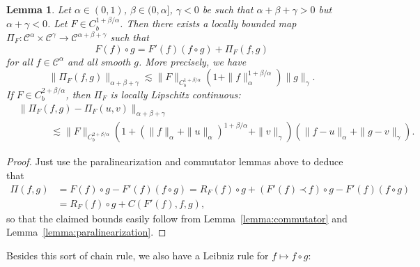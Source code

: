\documentclass[a4paper,11pt]{article}
\newtheorem{lemma}[theorem]{Lemma}
\theoremstyle{remark}
\newcommand{\CC}{\ensuremath{\mathscr{C}}}
\newcommand{\lpara}{\,\mathord{\prec}\,}
\newcommand{\reso}{\,\mathord{\circ}\,}
\begin{document}
\begin{lemma}\label{lemma:para-taylor}
  Let $\alpha \in ( 0,1 )$, $\beta \in (0,\alpha]$, $\gamma < 0$ be such that $\alpha+\beta+\gamma>0$ but $\alpha+\gamma<0$. Let $F \in C^{1+\beta/\alpha}_b$.
  Then there exists a locally bounded map $\Pi_{F} \colon \CC^{\alpha} \times \CC^{\gamma} \rightarrow \CC^{\alpha + \beta + \gamma}$ such that
  \begin{equation}\label{eq:para-taylor}
      F ( f ) \reso g=F' ( f ) ( f \reso g ) + \Pi_{F} ( f,g )
  \end{equation}
  for all $f \in \CC^{\alpha}$ and all smooth $g$. More precisely, we have
  \[
     \| \Pi_{F} ( f,g ) \|_{\alpha + \beta + \gamma} \lesssim \|F\|_{C^{1+\beta/\alpha}_b} (1+ \| f \|_{\alpha}^{1+\beta/\alpha} ) \| g \|_{\gamma}.
  \]
  If $F \in C^{2+\beta/\alpha}_b$, then $\Pi_{F}$ is locally Lipschitz continuous:
  \begin{align*}
     &\| \Pi_{F} ( f,g ) - \Pi_{F} ( u,v ) \|_{\alpha + \beta + \gamma} \\
     &\hspace{40pt} \lesssim \|F\|_{C^{2+\beta/\alpha}_b} (1 + (\|f\|_\alpha + \|u\|_\alpha)^{1+\beta/\alpha} + \|v\|_\gamma)  ( \| f-u \|_{\alpha} + \| g-v \|_{\gamma}).
  \end{align*}
\end{lemma}

\begin{proof}
  Just use the paralinearization and commutator lemmas above to deduce that
  \begin{align*}
     \Pi(f,g) & = F(f) \reso g - F'(f) (f \reso g) = R_F(f) \reso g + (F'(f)\lpara f) \reso g - F'(f) (f \reso g) \\
     & = R_F(f) \reso g + C(F'(f),f,g),
  \end{align*}
  so that the claimed bounds easily follow from Lemma~\ref{lemma:commutator} and Lemma~\ref{lemma:paralinearization}.
%  
\end{proof}

Besides this sort of chain rule, we also have a Leibniz rule for $f\mapsto f\reso g$:
\end{document}
